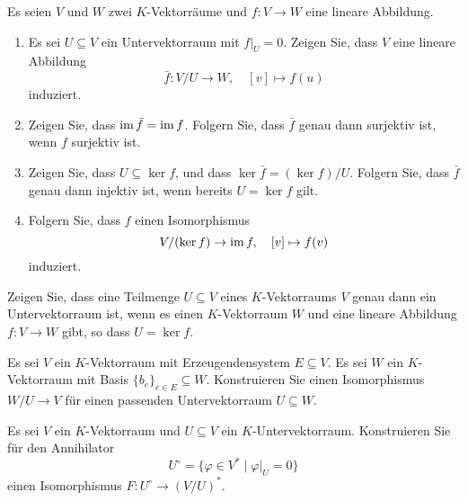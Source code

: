 \documentclass[a4paper,10pt]{scrartcl}
\begin{document}
\begin{question}
  Es seien $V$ und $W$ zwei $K$-Vektorräume und $f \colon V \to W$ eine lineare Abbildung.
  \begin{enumerate}[leftmargin=*]
    \item
      Es sei $U \subseteq V$ ein Untervektorraum mit $f|_U = 0$.
      Zeigen Sie, dass $V$ eine lineare Abbildung
      \[
        \bar{f} \colon V\!/U \to W, \quad [v] \mapsto f(u)
      \]
      induziert.
    \item
      Zeigen Sie, dass $\operatorname{im} \bar{f} = \operatorname{im} f$.
      Folgern Sie, dass $\bar{f}$ genau dann surjektiv ist, wenn $f$ surjektiv ist.
    \item
      Zeigen Sie, dass $U \subseteq \ker f$, und dass $\ker \bar{f} = (\ker f)/U$.
      Folgern Sie, dass $\bar{f}$ genau dann injektiv ist, wenn bereits $U = \ker f$ gilt.
    \item
      Folgern Sie, dass $f$ einen Isomorphismus
      \[
        V/(\ker f) \to \operatorname{im} f,
        \quad
        [v] \mapsto f(v)
      \]
      induziert.
  \end{enumerate}
\end{question}


\begin{question}
  Zeigen Sie, dass eine Teilmenge $U \subseteq V$ eines $K$-Vektorraums $V$ genau dann ein Untervektorraum ist, wenn es einen $K$-Vektorraum $W$ und eine lineare Abbildung $f \colon V \to W$ gibt, so dass $U = \ker f$.
\end{question}


\begin{question}
  Es sei $V$ ein $K$-Vektorraum mit Erzeugendensystem $E \subseteq V$.
  Es sei $W$ ein $K$-Vektorraum mit Basis $\{b_e\}_{e \in E} \subseteq W$.
  Konstruieren Sie einen Isomorphismus $W\!/U \to V$ für einen passenden Untervektorraum $U \subseteq W$.
\end{question}


\begin{question}
  Es sei $V$ ein $K$-Vektorraum und $U \subseteq V$ ein $K$-Untervektorraum.
  Konstruieren Sie für den Annihilator
  \[
      U^\circ
    = \{ \varphi \in V^* \mid \varphi|_U = 0 \}
  \]
  einen Isomorphismus $F \colon U^\circ \to (V\!/U)^*$.
\end{question}
\end{document}
